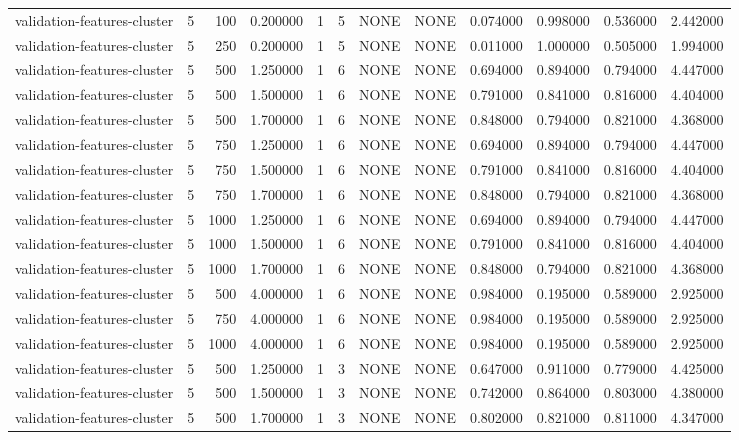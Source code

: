 \begin{tabular}{lrrrllllrrrr}
validation-features-cluster & 5 & 100 & 0.200000 & 1 & 5 & NONE & NONE & 0.074000 & 0.998000 & 0.536000 & 2.442000 \\
validation-features-cluster & 5 & 250 & 0.200000 & 1 & 5 & NONE & NONE & 0.011000 & 1.000000 & 0.505000 & 1.994000 \\
validation-features-cluster & 5 & 500 & 1.250000 & 1 & 6 & NONE & NONE & 0.694000 & 0.894000 & 0.794000 & 4.447000 \\
validation-features-cluster & 5 & 500 & 1.500000 & 1 & 6 & NONE & NONE & 0.791000 & 0.841000 & 0.816000 & 4.404000 \\
validation-features-cluster & 5 & 500 & 1.700000 & 1 & 6 & NONE & NONE & 0.848000 & 0.794000 & 0.821000 & 4.368000 \\
validation-features-cluster & 5 & 750 & 1.250000 & 1 & 6 & NONE & NONE & 0.694000 & 0.894000 & 0.794000 & 4.447000 \\
validation-features-cluster & 5 & 750 & 1.500000 & 1 & 6 & NONE & NONE & 0.791000 & 0.841000 & 0.816000 & 4.404000 \\
validation-features-cluster & 5 & 750 & 1.700000 & 1 & 6 & NONE & NONE & 0.848000 & 0.794000 & 0.821000 & 4.368000 \\
validation-features-cluster & 5 & 1000 & 1.250000 & 1 & 6 & NONE & NONE & 0.694000 & 0.894000 & 0.794000 & 4.447000 \\
validation-features-cluster & 5 & 1000 & 1.500000 & 1 & 6 & NONE & NONE & 0.791000 & 0.841000 & 0.816000 & 4.404000 \\
validation-features-cluster & 5 & 1000 & 1.700000 & 1 & 6 & NONE & NONE & 0.848000 & 0.794000 & 0.821000 & 4.368000 \\
validation-features-cluster & 5 & 500 & 4.000000 & 1 & 6 & NONE & NONE & 0.984000 & 0.195000 & 0.589000 & 2.925000 \\
validation-features-cluster & 5 & 750 & 4.000000 & 1 & 6 & NONE & NONE & 0.984000 & 0.195000 & 0.589000 & 2.925000 \\
validation-features-cluster & 5 & 1000 & 4.000000 & 1 & 6 & NONE & NONE & 0.984000 & 0.195000 & 0.589000 & 2.925000 \\
validation-features-cluster & 5 & 500 & 1.250000 & 1 & 3 & NONE & NONE & 0.647000 & 0.911000 & 0.779000 & 4.425000 \\
validation-features-cluster & 5 & 500 & 1.500000 & 1 & 3 & NONE & NONE & 0.742000 & 0.864000 & 0.803000 & 4.380000 \\
validation-features-cluster & 5 & 500 & 1.700000 & 1 & 3 & NONE & NONE & 0.802000 & 0.821000 & 0.811000 & 4.347000 \\

\end{tabular}
